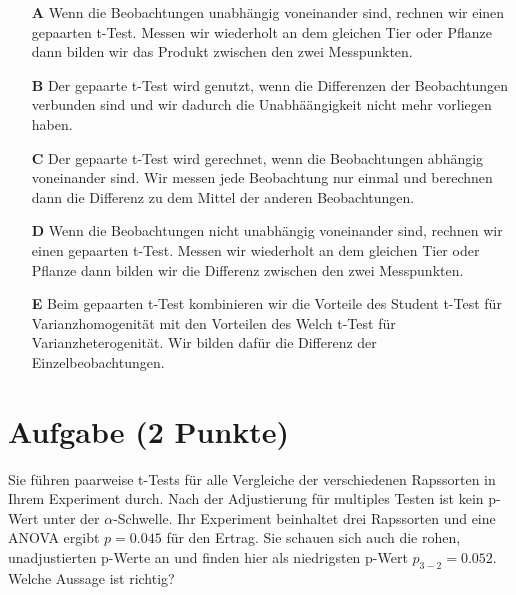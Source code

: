 \documentclass[a4paper, 9pt]{scrartcl}\usepackage[]{graphicx}\usepackage[]{xcolor}
\begin{document}
\begin{enumerate}
\item [\textbf{A} \msquare] Wenn die Beobachtungen unabhängig voneinander sind, rechnen wir einen gepaarten t-Test. Messen wir wiederholt an dem gleichen Tier oder Pflanze dann bilden wir das Produkt zwischen den zwei Messpunkten.
\item [\textbf{B} \msquare] Der gepaarte t-Test wird genutzt, wenn die Differenzen der Beobachtungen verbunden sind und wir dadurch die Unabhäängigkeit nicht mehr vorliegen haben.
\item [\textbf{C} \msquare] Der gepaarte t-Test wird gerechnet, wenn die Beobachtungen abhängig voneinander sind. Wir messen jede Beobachtung nur einmal und berechnen dann die Differenz zu dem Mittel der anderen Beobachtungen.
\item [\textbf{D} \msquare] Wenn die Beobachtungen nicht unabhängig voneinander sind, rechnen wir einen gepaarten t-Test. Messen wir wiederholt an dem gleichen Tier oder Pflanze dann bilden wir die Differenz zwischen den zwei Messpunkten.
\item [\textbf{E} \msquare] Beim gepaarten t-Test kombinieren wir die Vorteile des Student t-Test für Varianzhomogenität mit den Vorteilen des Welch t-Test für Varianzheterogenität. Wir bilden dafür die Differenz der Einzelbeobachtungen.
\end{enumerate}

\section{Aufgabe \hfill (2 Punkte)}



Sie führen paarweise t-Tests für alle Vergleiche der verschiedenen Rapssorten in Ihrem Experiment durch. Nach der Adjustierung für multiples Testen ist kein p-Wert unter der $\alpha$-Schwelle. Ihr Experiment beinhaltet drei Rapssorten und eine ANOVA ergibt $p = 0.045$ für den Ertrag. Sie schauen sich auch die rohen, unadjustierten p-Werte an und finden hier als niedrigsten p-Wert $p_{3-2} = 0.052$. Welche Aussage ist richtig?
\end{document}
